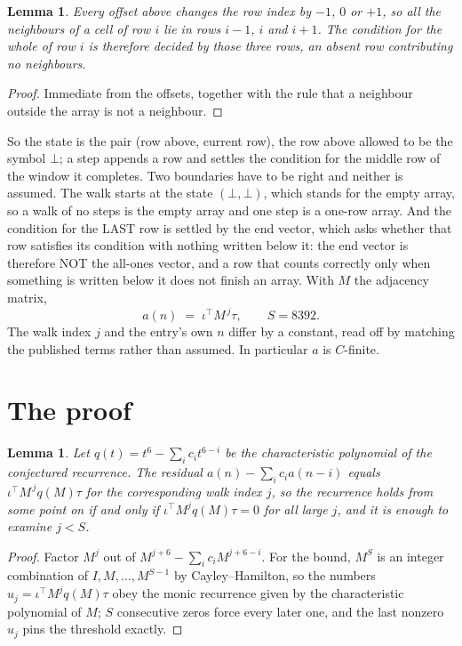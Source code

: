 \documentclass[11pt,a4paper]{article}
\theoremstyle{plain}
\newtheorem{lemma}[theorem]{Lemma}
\theoremstyle{definition}
\begin{document}
\begin{lemma}\label{lem:win}
Every offset above changes the row index by $-1$, $0$ or $+1$, so all the neighbours of a cell
of row $i$ lie in rows $i-1$, $i$ and $i+1$. The condition for the whole of row $i$ is
therefore decided by those three rows, an absent row contributing no neighbours.
\end{lemma}

\begin{proof}
Immediate from the offsets, together with the rule that a neighbour outside the array is not a
neighbour.
\end{proof}

So the state is the pair (row above, current row), the row above allowed to be the symbol
$\bot$; a step appends a row and settles the condition for the middle row of the window it
completes. Two boundaries have to be right and neither is assumed. The walk starts at the state
$(\bot,\bot)$, which stands for the empty array, so a walk of no steps is the empty array and
one step is a one-row array. And the condition for the LAST row is settled by the end vector,
which asks whether that row satisfies its condition with nothing written below it: the end
vector is therefore NOT the all-ones vector, and a row that counts correctly only when
something is written below it does not finish an array. With $M$ the adjacency matrix,
\[
a(n)\;=\;\iota^{\!\top}M^{\,j}\tau ,\qquad S=8392.
\]
The walk index $j$ and the entry's own $n$ differ by a constant, read off by matching the
published terms rather than assumed. In particular $a$ is $C$-finite.

\section{The proof}

\begin{lemma}\label{lem:crit}
Let $q(t)=t^{6}-\sum_i c_it^{6-i}$ be the characteristic polynomial of the
conjectured recurrence. The residual $a(n)-\sum_ic_ia(n-i)$ equals
$\iota^{\!\top}M^{\,j}q(M)\tau$ for the corresponding walk index $j$, so the recurrence
holds from some point on if and only if $\iota^{\!\top}M^{j}q(M)\tau=0$ for all large $j$,
and it is enough to examine $j<S$.
\end{lemma}

\begin{proof}
Factor $M^{j}$ out of $M^{j+6}-\sum_ic_iM^{j+6-i}$. For the bound, $M^{S}$
is an integer combination of $I,M,\dots,M^{S-1}$ by Cayley--Hamilton, so the numbers
$u_j=\iota^{\!\top}M^{j}q(M)\tau$ obey the monic recurrence given by the characteristic
polynomial of $M$; $S$ consecutive zeros force every later one, and the last nonzero $u_j$
pins the threshold exactly.
\end{proof}
\end{document}
